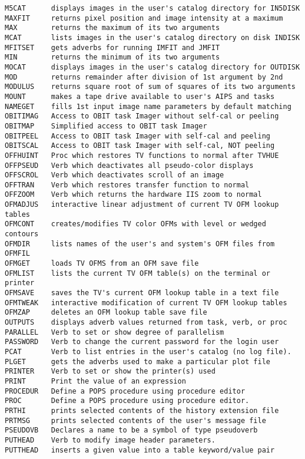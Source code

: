 \begin{verbatim}
M5CAT      displays images in the user's catalog directory for IN5DISK
MAXFIT     returns pixel position and image intensity at a maximum
MAX        returns the maximum of its two arguments
MCAT       lists images in the user's catalog directory on disk INDISK
MFITSET    gets adverbs for running IMFIT and JMFIT
MIN        returns the minimum of its two arguments
MOCAT      displays images in the user's catalog directory for OUTDISK
MOD        returns remainder after division of 1st argument by 2nd
MODULUS    returns square root of sum of squares of its two arguments
MOUNT      makes a tape drive available to user's AIPS and tasks
NAMEGET    fills 1st input image name parameters by default matching
OBITIMAG   Access to OBIT task Imager without self-cal or peeling
OBITMAP    Simplified access to OBIT task Imager
OBITPEEL   Access to OBIT task Imager with self-cal and peeling
OBITSCAL   Access to OBIT task Imager with self-cal, NOT peeling
OFFHUINT   Proc which restores TV functions to normal after TVHUE
OFFPSEUD   Verb which deactivates all pseudo-color displays
OFFSCROL   Verb which deactivates scroll of an image
OFFTRAN    Verb which restores transfer function to normal
OFFZOOM    Verb which returns the hardware IIS zoom to normal
OFMADJUS   interactive linear adjustment of current TV OFM lookup tables
OFMCONT    creates/modifies TV color OFMs with level or wedged contours
OFMDIR     lists names of the user's and system's OFM files from OFMFIL
OFMGET     loads TV OFMS from an OFM save file
OFMLIST    lists the current TV OFM table(s) on the terminal or printer
OFMSAVE    saves the TV's current OFM lookup table in a text file
OFMTWEAK   interactive modification of current TV OFM lookup tables
OFMZAP     deletes an OFM lookup table save file
OUTPUTS    displays adverb values returned from task, verb, or proc
PARALLEL   Verb to set or show degree of parallelism
PASSWORD   Verb to change the current password for the login user
PCAT       Verb to list entries in the user's catalog (no log file).
PLGET      gets the adverbs used to make a particular plot file
PRINTER    Verb to set or show the printer(s) used
PRINT      Print the value of an expression
PROCEDUR   Define a POPS procedure using procedure editor
PROC       Define a POPS procedure using procedure editor.
PRTHI      prints selected contents of the history extension file
PRTMSG     prints selected contents of the user's message file
PSEUDOVB   Declares a name to be a symbol of type pseudoverb
PUTHEAD    Verb to modify image header parameters.
PUTTHEAD   inserts a given value into a table keyword/value pair

\end{verbatim}
